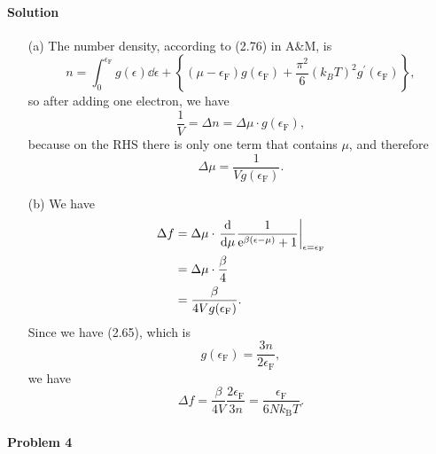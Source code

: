 \documentclass[hyperref, a4paper]{article}
\newcommand*{\ee}{\mathrm{e}}
\begin{document}
\paragraph{Solution} \begin{itemize}
\item[(a)] The number density, according to (2.76) in A\&M, is 
\begin{equation}
    n=\int_0^{\epsilon_\text{F}} g(\epsilon) \dd \epsilon +\left\{\left(\mu-\epsilon_\text{F}\right) g\left(\epsilon_\text{F}\right)+\frac{\pi^2}{6}\left(k_B T\right)^2 g^{\prime}\left(\epsilon_\text{F}\right)\right\} ,
\end{equation}
so after adding one electron, we have 
\[
    \frac{1}{V} = \Delta n = \Delta \mu \cdot g(\epsilon_{\text{F}}),
\]
because on the RHS there is only one term that contains $\mu$,
and therefore 
\begin{equation}
    \Delta \mu = \frac{1}{V g(\epsilon_{\text{F}})}.
\end{equation}
\item[(b)] We have
\[
    \begin{aligned}
        \Delta f &= \Delta \mu \cdot \eval{\dv{\mu} 
        \frac{1}{\ee^{\beta (\epsilon - \mu)} + 1}}_{\epsilon = \epsilon_{\text{F}}}  \\
        &= \Delta \mu \cdot \frac{\beta}{4} \\
        &= \frac{\beta}{4 V g(\epsilon_{\text{F}})}. 
    \end{aligned}
\]
Since we have (2.65), which is 
\[
    g(\epsilon_{\text{F}}) = \frac{3 n }{2 \epsilon_{\text{F}}},
\]
we have 
\begin{equation}
    \Delta f =  \frac{\beta}{4 V } \frac{2 \epsilon_{\text{F}}}{3 n} 
    = \frac{\epsilon_{\text{F}}}{6 N k_{\text{B}} T}.
\end{equation}
\end{itemize}

\paragraph{Problem 4}
\end{document}
